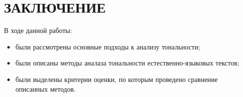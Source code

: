 \chapter*{ЗАКЛЮЧЕНИЕ}

В ходе данной работы:
\begin{itemize}
    \item были рассмотрены основные подходы к анализу тональности;
    \item были описаны методы аналаза тональности естественно-языковых текстов;
    \item были выделены критерии оценки, по которым проведено сравнение
        описанных методов.
\end{itemize}

